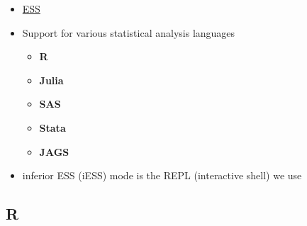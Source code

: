 \documentclass[11pt]{article}
\begin{document}
\begin{itemize}
\item \href{https://ess.r-project.org/}{ESS}

\item Support for various statistical analysis languages

\begin{itemize}
\item \textbf{R}

\item \textbf{Julia}

\item \textbf{SAS}

\item \textbf{Stata}

\item \textbf{JAGS}
\end{itemize}

\item inferior ESS (iESS) mode is the REPL (interactive shell) we use
\end{itemize}

\subsection{R}
\label{sec:org64c2f1e}
\end{document}
